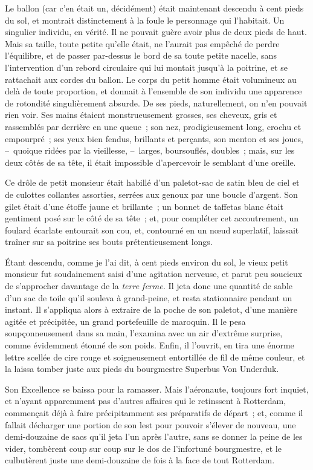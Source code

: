 \documentclass[french,twoside]{book} %
\begin{document}
Le ballon (car c’en était un, décidément) était maintenant descendu à cent pieds du sol, et montrait distinctement à la foule le personnage qui l’habitait. Un singulier individu, en vérité. Il ne pouvait guère avoir plus de deux pieds de haut. Mais sa taille, toute petite qu’elle était, ne l’aurait pas empêché de perdre l’équilibre, et de passer par-dessus le bord de sa toute petite nacelle, sans l’intervention d’un rebord circulaire qui lui montait jusqu’à la poitrine, et se rattachait aux cordes du ballon. Le corps du petit homme était volumineux au delà de toute proportion, et donnait à l’ensemble de son individu une apparence de rotondité singulièrement absurde. De ses pieds, naturellement, on n’en pouvait rien voir. Ses mains étaient monstrueusement grosses, ses cheveux, gris et rassemblés par derrière en une queue ; son nez, prodigieusement long, crochu et empourpré ; ses yeux bien fendus, brillants et perçants, son menton et ses joues, – quoique ridées par la vieillesse, – larges, boursouflés, doubles ; mais, sur les deux côtés de sa tête, il était impossible d’apercevoir le semblant d’une oreille.\par
Ce drôle de petit monsieur était habillé d’un paletot-sac de satin bleu de ciel et de culottes collantes assorties, serrées aux genoux par une boucle d’argent. Son gilet était d’une étoffe jaune et brillante ; un bonnet de taffetas blanc était gentiment posé sur le côté de sa tête ; et, pour compléter cet accoutrement, un foulard écarlate entourait son cou, et, contourné en un nœud superlatif, laissait traîner sur sa poitrine ses bouts prétentieusement longs.\par
Étant descendu, comme je l’ai dit, à cent pieds environ du sol, le vieux petit monsieur fut soudainement saisi d’une agitation nerveuse, et parut peu soucieux de s’approcher davantage de la \emph{terre ferme.} Il jeta donc une quantité de sable d’un sac de toile qu’il souleva à grand-peine, et resta stationnaire pendant un instant. Il s’appliqua alors à extraire de la poche de son paletot, d’une manière agitée et précipitée, un grand portefeuille de maroquin. Il le pesa soupçonneusement dans sa main, l’examina avec un air d’extrême surprise, comme évidemment étonné de son poids. Enfin, il l’ouvrit, en tira une énorme lettre scellée de cire rouge et soigneusement entortillée de fil de même couleur, et la laissa tomber juste aux pieds du bourgmestre Superbus Von Underduk.\par
Son Excellence se baissa pour la ramasser. Mais l’aéronaute, toujours fort inquiet, et n’ayant apparemment pas d’autres affaires qui le retinssent à Rotterdam, commençait déjà à faire précipitamment ses préparatifs de départ ; et, comme il fallait décharger une portion de son lest pour pouvoir s’élever de nouveau, une demi-douzaine de sacs qu’il jeta l’un après l’autre, sans se donner la peine de les vider, tombèrent coup sur coup sur le dos de l’infortuné bourgmestre, et le culbutèrent juste une demi-douzaine de fois à la face de tout Rotterdam.\par
\end{document}
